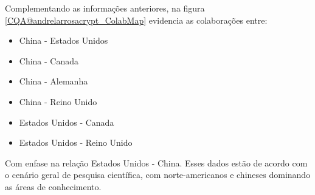 Complementando as informações anteriores, na figura \ref{CQA@andrelarrosacrypt_ColabMap} evidencia as colaborações entre:

\begin{itemize}
    \item China - Estados Unidos
    \item China - Canada
    \item China - Alemanha
    \item China - Reino Unido
    \item Estados Unidos - Canada
    \item Estados Unidos - Reino Unido
\end{itemize}

Com enfase na relação Estados Unidos - China. Esses dados estão de acordo com o cenário geral de pesquisa científica, com norte-americanos e chineses dominando as áreas de conhecimento.